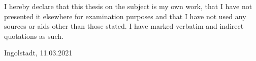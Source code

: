 \thispagestyle{plain}

I hereby declare that this thesis on the subject is my own work, that I have not presented it elsewhere for examination purposes and that I have not used any sources or aids other than those stated. I have marked verbatim and indirect quotations as such.
\vspace{3cm}

Ingolstadt, 11.03.2021
